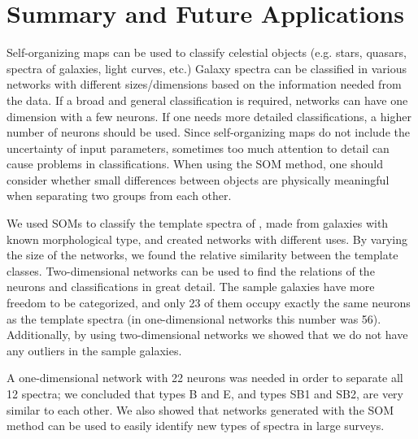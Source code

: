 \documentclass[useAMS,usenatbib]{mn2e}
\begin{document}
\section{Summary and Future Applications}
\label{sec: summary_SOMZ}

    Self-organizing maps can be used to classify celestial objects (e.g. stars, quasars, spectra of galaxies, light curves, etc.)
    Galaxy spectra can be classified in various networks with different sizes/dimensions based on the information needed from the data. 
    If a broad and general classification is required, networks can have one dimension with a few neurons. 
    If one needs more detailed classifications, a higher number of neurons should be used.
    Since self-organizing maps do not include the uncertainty of input parameters, sometimes too much attention to detail can cause problems in classifications. 
    When using the SOM method, one should consider whether small differences between objects are physically meaningful when separating two groups from each other.

    We used SOMs to classify the template spectra of , made from galaxies with known morphological type, and created networks with different uses.
    By varying the size of the networks, we found the relative similarity between the  template classes.
    Two-dimensional networks can be used to find the relations of the neurons and classifications in great detail.
    The sample galaxies have more freedom to be categorized, and only 23 of them occupy exactly the same neurons as the  template spectra (in one-dimensional networks this number was 56).
    Additionally, by using two-dimensional networks we showed that we do not have any outliers in the sample galaxies.

    A one-dimensional network with 22 neurons was needed in order to
    separate all 12  spectra; we concluded that  types B and E, and types SB1 and SB2, are very similar to each other.
    We also showed that networks generated with the SOM method can be used to easily identify new types of spectra in large surveys.
\end{document}
